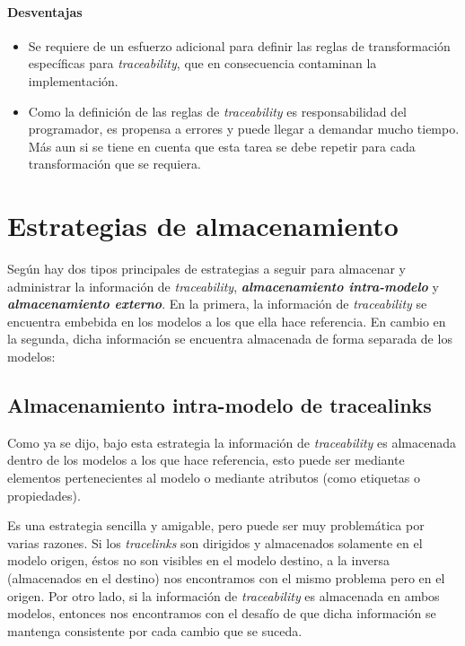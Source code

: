 \documentclass[a4paper,12pt,oneside,spanish]{book}
\begin{document}
\paragraph{Desventajas}

\begin{itemize}[label={$\times$}]

\item Se requiere de un esfuerzo adicional para definir las reglas de transformación específicas para \textit{traceability}, que en consecuencia contaminan la implementación.

\item Como la definición de las reglas de \textit{traceability} es responsabilidad del programador, es propensa a errores y puede llegar a demandar mucho tiempo. Más aun si se tiene en cuenta que esta tarea se debe repetir para cada transformación que se requiera.

\end{itemize}


\section{Estrategias de almacenamiento}

Según \cite{DrivalosPaigeFernandesKolovos} hay dos tipos principales de estrategias a seguir para almacenar y administrar la información de \textit{traceability}, \textit{\textbf{almacenamiento intra-modelo}} y \textit{\textbf{almacenamiento externo}}. En la primera, la información de \textit{traceability} se encuentra embebida en los modelos a los que ella hace referencia. En cambio en la segunda, dicha información se encuentra almacenada de forma separada de los modelos:

\subsection{Almacenamiento intra-modelo de tracealinks}

Como ya se dijo, bajo esta estrategia la información de \textit{traceability} es almacenada dentro de los modelos a los que hace referencia, esto puede ser mediante elementos pertenecientes al modelo o mediante atributos (como etiquetas o propiedades).

Es una estrategia sencilla y amigable, pero puede ser muy problemática por varias razones. Si los \textit{tracelinks} son dirigidos y almacenados solamente en el modelo origen, éstos no son visibles en el modelo destino, a la inversa (almacenados en el destino) nos encontramos con el mismo problema pero en el origen. Por otro lado, si la información de \textit{traceability} es almacenada en ambos modelos, entonces nos encontramos con el desafío de que dicha información se mantenga consistente por cada cambio que se suceda.
\end{document}
